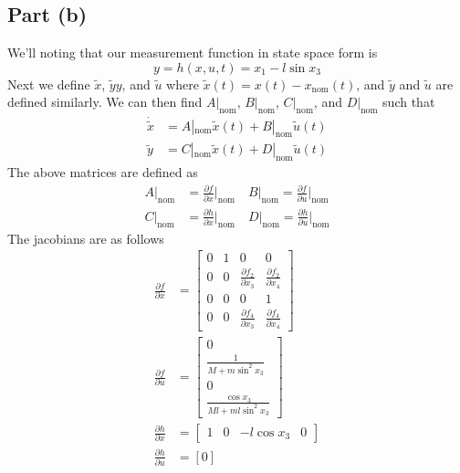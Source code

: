 \documentclass[11pt]{article}
\begin{document}
\subsection*{Part (b)}
We'll noting that our measurement function in state space form is
\begin{equation*}
	y = h(x,u,t) = x_1 - l\sin x_3
\end{equation*}
Next we define $\tilde{x}$, $\tilde{y}y$, and $\tilde{u}$ where $\tilde{x}(t) = x(t) - x_\text{nom}(t)$, and $\tilde{y}$ and $\tilde{u}$ are defined similarly. We can then find $A|_\text{nom}$, $B|_\text{nom}$, $C|_\text{nom}$, and $D|_\text{nom}$ such that 
\begin{align*}
	\dot{\tilde{x}} &= A|_\text{nom}\tilde{x}(t) + B|_\text{nom}\tilde{u}(t) \\
	\tilde{y} &= C|_\text{nom}\tilde{x}(t) + D|_\text{nom}\tilde{u}(t)
\end{align*} 
The above matrices are defined as
\begin{align*}
	A|_\text{nom} &= \frac{\partial f}{\partial x} \Bigg|_\text{nom}\quad B|_\text{nom} = \frac{\partial f}{\partial u} \Bigg|_\text{nom} \\
	C|_\text{nom} &= \frac{\partial h}{\partial x} \Bigg|_\text{nom}\quad D|_\text{nom} = \frac{\partial h}{\partial u}\Bigg|_\text{nom}
\end{align*}
The jacobians are as follows
\begin{align*}
	\frac{\partial f}{\partial x} &= \begin{bmatrix} 0&1&0&0 \\ 0&0&\frac{\partial f_2}{\partial x_3}&\frac{\partial f_2}{\partial x_4} \\ 0&0&0&1 \\ 0&0&\frac{\partial f_4}{\partial x_3}&\frac{\partial f_4}{\partial x_4}\end{bmatrix} \\
	\frac{\partial f}{\partial u} &= \begin{bmatrix} 0 \\ \frac{1}{M+m\sin^2x_3} \\ 0 \\ \frac{\cos x_3}{Ml + ml \sin^2x_3} \end{bmatrix} \\
	\frac{\partial h}{\partial x} &= \begin{bmatrix} 1&0&-l\cos x_3&0\end{bmatrix} \\
	\frac{\partial h}{\partial u} &= [0]
\end{align*}
\end{document}
